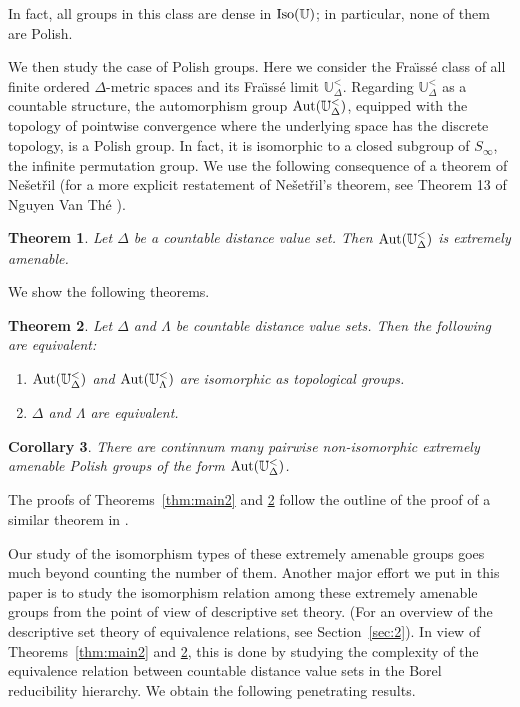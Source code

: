 \documentclass{amsart}
\newtheorem{theorem}{Theorem}[section]
\newtheorem{corollary}[theorem]{Corollary}
\theoremstyle{definition}
\theoremstyle{remark}
\begin{document}
In fact, all groups in this class are dense in $\mbox{\rm Iso}(\mathbb{U})$; in particular, none of them are Polish.

We then study the case of Polish groups. Here we consider the Fra\"{\i}ss\'{e} class of all finite ordered $\Delta$-metric spaces and its Fra\"{\i}ss\'{e} limit $\mathbb{U}^{<}_{\Delta}$. Regarding $\mathbb{U}^{<}_{\Delta}$ as a countable structure, the automorphism group $\mbox{\rm Aut}(\mathbb{U}^{<}_{\Delta})$, equipped with the topology of pointwise convergence where the underlying space has the discrete topology, is a Polish group. In fact, it is isomorphic to a closed subgroup of $S_\infty$, the infinite permutation group. We use the following consequence of a theorem of Ne\v{s}et\v{r}il \cite{Nes07} (for a more explicit restatement of Ne\v{s}et\v{r}il's theorem, see Theorem 13 of Nguyen Van Th\'e \cite{NVTMAMS}).

\begin{theorem}\label{thm:main4} Let $\Delta$ be a countable distance value set. Then $\mbox{\rm Aut}(\mathbb{U}^{<}_{\Delta})$ is extremely amenable.
\end{theorem}

We show the following theorems.

\begin{theorem}\label{thm:main5} Let $\Delta$ and $\Lambda$ be countable distance value sets. Then the following are equivalent:
\begin{enumerate}
\item[\rm (i)] $\mbox{\rm Aut}(\mathbb{U}^{<}_{\Delta})$ and $\mbox{\rm Aut}(\mathbb{U}^{<}_{\Lambda})$ are isomorphic as topological groups.
\item[\rm (ii)] $\Delta$ and $\Lambda$ are equivalent.
\end{enumerate}
\end{theorem}

\begin{corollary}\label{thm:main6} There are continnum many pairwise non-isomorphic extremely amenable Polish groups of the form $\mbox{\rm Aut}(\mathbb{U}^{<}_{\Delta})$.
\end{corollary}

The proofs of Theorems~\ref{thm:main2} and \ref{thm:main5} follow the outline of the proof of a similar theorem in \cite{EGLMM}.

Our study of the isomorphism types of these extremely amenable groups goes much beyond counting the number of them. Another major effort we put in this paper is to study the isomorphism relation among these extremely amenable groups from the point of view of descriptive set theory. (For an overview of the descriptive set theory of equivalence relations, see Section~\ref{sec:2}). In view of Theorems~\ref{thm:main2} and \ref{thm:main5}, this is done by studying the complexity of the equivalence relation between countable distance value sets in the Borel reducibility hierarchy. We obtain the following penetrating results.
\end{document}
